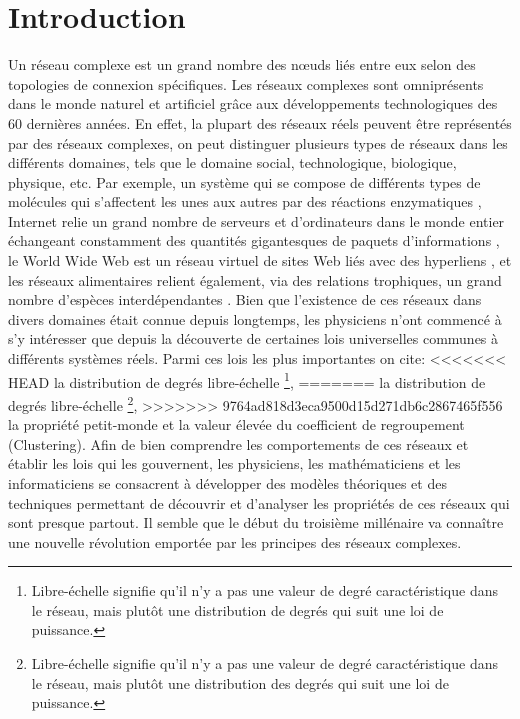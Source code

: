 %
%
\chapter*{Introduction}
Un réseau complexe est un grand nombre des nœuds liés entre eux selon des topologies de connexion spécifiques. Les réseaux complexes sont omniprésents dans le monde naturel et artificiel grâce aux développements technologiques des $60$ dernières années. En effet,  la plupart des réseaux réels peuvent être représentés par des réseaux complexes, on peut distinguer plusieurs types de réseaux dans les différents domaines, tels que le domaine social, technologique, biologique, physique, etc. Par exemple, un système qui se compose de différents types de molécules qui s'affectent les unes aux autres par des réactions enzymatiques \cite{Je-al2000}, Internet  relie un grand nombre de serveurs et d'ordinateurs dans le monde entier échangeant constamment des quantités gigantesques de paquets d'informations \cite{F-al1999}, le World Wide Web est un réseau virtuel de sites Web liés avec des hyperliens \cite{BA1999}, et les réseaux alimentaires relient également, via des relations trophiques, un grand nombre d'espèces interdépendantes \cite{Co-al1990,Pim-al2002}. Bien que l'existence de ces réseaux dans divers domaines était connue depuis longtemps, les physiciens n'ont commencé à s'y intéresser que depuis la découverte de certaines lois universelles communes à différents systèmes réels. Parmi ces lois les plus importantes on cite: 
<<<<<<< HEAD
\textsf{la distribution de degrés} libre-échelle \footnote{ Libre-échelle signifie qu'il n'y a pas une valeur de degré caractéristique dans le réseau, mais plutôt une distribution de degrés qui suit une loi de puissance.},
=======
\textsf{la distribution de degrés} libre-échelle \footnote{ Libre-échelle signifie qu'il n'y a pas une valeur de degré caractéristique dans le réseau, mais plutôt une distribution des degrés qui suit une loi de puissance.},
>>>>>>> 9764ad818d3eca9500d15d271db6c2867465f556
la propriété \textsf{petit-monde}  
et la valeur élevée du \textsf{coefficient de regroupement} (Clustering). Afin de bien comprendre les comportements de ces réseaux et établir les lois qui les gouvernent, les physiciens, les mathématiciens et les informaticiens se consacrent à développer des modèles théoriques et des techniques permettant de découvrir  et d'analyser les propriétés de ces réseaux qui sont presque partout. Il semble que le début du troisième millénaire va connaître une nouvelle révolution emportée par les principes des réseaux complexes.\\


